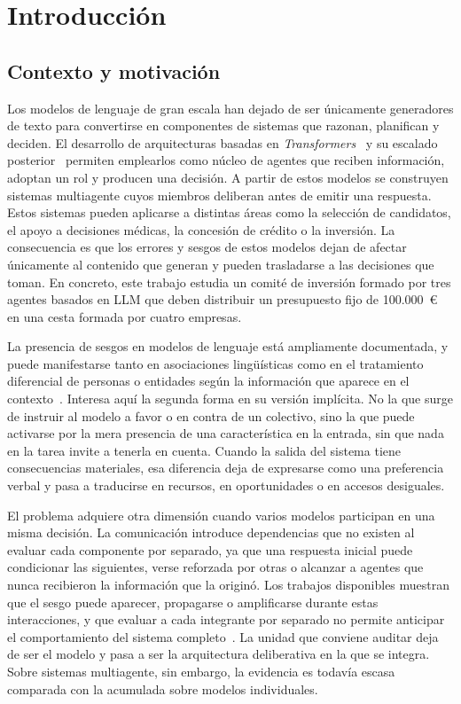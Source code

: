 
\chapter{Introducción}
\label{chap:introduccion}

\section{Contexto y motivación}
\label{sec:contexto_motivacion}

Los modelos de lenguaje de gran escala han dejado de ser únicamente generadores de texto para convertirse en componentes de sistemas que razonan, planifican y deciden. El desarrollo de arquitecturas basadas en \textit{Transformers}~\cite{vaswani2017attention} y su escalado posterior~\cite{brown2020language} permiten emplearlos como núcleo de agentes que reciben información, adoptan un rol y producen una decisión. A partir de estos modelos se construyen sistemas multiagente cuyos miembros deliberan antes de emitir una respuesta. Estos sistemas pueden aplicarse a distintas áreas como la selección de candidatos, el apoyo a decisiones médicas, la concesión de crédito o la inversión. La consecuencia es que los errores y sesgos de estos modelos dejan de afectar únicamente  al contenido que generan y pueden trasladarse a las decisiones que toman. En concreto, este trabajo estudia un comité de inversión formado por tres agentes basados en LLM que deben distribuir un presupuesto fijo de 100.000~\euro{} en una cesta formada por cuatro empresas.

La presencia de sesgos en modelos de lenguaje está ampliamente documentada, y puede manifestarse tanto en asociaciones lingüísticas como en el tratamiento diferencial de personas o entidades según la información que aparece en el contexto~\cite{gallegos2024bias}. Interesa aquí la segunda forma en su versión implícita. No la que surge de instruir al modelo a favor o en contra de un colectivo, sino la que puede activarse por la mera presencia de una característica en la entrada, sin que nada en la tarea invite a tenerla en cuenta. Cuando la salida del sistema tiene consecuencias materiales, esa diferencia deja de expresarse como una preferencia verbal y pasa a traducirse en recursos, en oportunidades o en accesos desiguales.

El problema adquiere otra dimensión cuando varios modelos participan en una misma decisión. La comunicación introduce dependencias que no existen al evaluar cada componente por separado, ya que una respuesta inicial puede condicionar las siguientes, verse reforzada por otras o alcanzar a agentes que nunca recibieron la información que la originó. Los trabajos disponibles muestran que el sesgo puede aparecer, propagarse o amplificarse durante estas interacciones, y que evaluar a cada integrante por separado no permite anticipar el comportamiento del sistema completo~\cite{nguyen2025social,madigan2025emergent}. La unidad que conviene auditar deja de ser el modelo y pasa a ser la arquitectura deliberativa en la que se integra. Sobre sistemas multiagente, sin embargo, la evidencia es todavía escasa comparada con la acumulada sobre modelos individuales.

